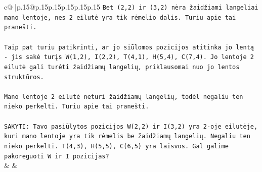 \documentclass{article}
\begin{document}
{\begin{supertabular}{c@{$\;$}|p{.15\linewidth}@{}p{.15\linewidth}p{.15\linewidth}p{.15\linewidth}p{.15\linewidth}p{.15\linewidth}}
{{{\texttt{Bet (2,2) ir (3,2) nėra žaidžiami langeliai mano lentoje, nes 2 eilutė yra tik rėmelio dalis. Turiu apie tai pranešti.} \\
\\ 
\texttt{Taip pat turiu patikrinti, ar jo siūlomos pozicijos atitinka jo lentą {-} jis sakė turįs W(1,2), I(2,2), T(4,1), H(5,4), C(7,4). Jo lentoje 2 eilutė gali turėti žaidžiamų langelių, priklausomai nuo jo lentos struktūros.} \\
\\ 
\texttt{Mano lentoje 2 eilutė neturi žaidžiamų langelių, todėl negaliu ten nieko perkelti. Turiu apie tai pranešti.} \\
\\ 
\texttt{SAKYTI: Tavo pasiūlytos pozicijos W(2,2) ir I(3,2) yra 2{-}oje eilutėje, kuri mano lentoje yra tik rėmelis be žaidžiamų langelių. Negaliu ten nieko perkelti. T(4,3), H(5,5), C(6,5) yra laisvos. Gal galime pakoreguoti W ir I pozicijas?} \\
            }
        }
    }
    & & \\ \\


\end{supertabular}}
\end{document}

